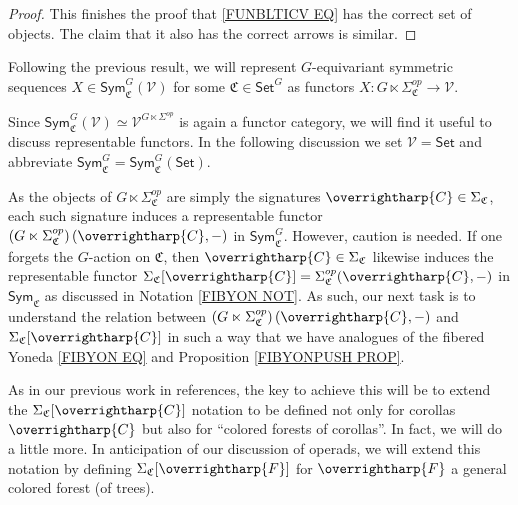 \documentclass[a4paper,10pt
,draft
]{article}%
\numberwithin{equation}{section}
\numberwithin{figure}{section}
\theoremstyle{definition} %
\newcommand{\vect}[1]{\text{\overrightharp{\ensuremath{#1}}}}
\newcommand{\V}{\ensuremath{\mathcal V}}
\newcommand{\1}{\ensuremath{\mathbbm 1}}%
\begin{document}
\begin{proof}
This finishes the proof that \eqref{FUNBLTICV EQ} has the correct set of objects. The claim that it also has the correct arrows is similar.
\end{proof}



Following the previous result, 
we will represent $G$-equivariant symmetric sequences
$X \in \mathsf{Sym}^G_{\mathfrak{C}}(\mathcal{V})$
for some $\mathfrak{C} \in \mathsf{Set}^G$
as functors
$X \colon G \ltimes \Sigma_{\mathfrak{C}}^{op} \to \mathcal{V}$.

Since  
$\mathsf{Sym}^G_{\mathfrak{C}}(\mathcal{V}) \simeq 
\V^{G \ltimes \Sigma^{op}}$ is again a functor category, 
we will find it useful to discuss representable functors.
In the following discussion 
we set $\V = \mathsf{Set}$ and abbreviate
$\mathsf{Sym}^G_{\mathfrak{C}} = \mathsf{Sym}^G_{\mathfrak{C}}(\mathsf{Set})$.

As the objects of 
$G \ltimes \Sigma^{op}_{\mathfrak{C}}$
are simply the signatures
$\vect{C} \in \Sigma_{\mathfrak{C}}$,
each such signature induces a representable functor
$\left(G \ltimes \Sigma^{op}_{\mathfrak{C}}\right)(\vect{C},-)$
in 
$\mathsf{Sym}^G_{\mathfrak{C}}$.
However, caution is needed.
If one forgets the $G$-action on $\mathfrak{C}$,
then $\vect{C} \in \Sigma_{\mathfrak{C}}$
likewise induces the representable functor 
$\Sigma_{\mathfrak{C}}[\vect{C}]=\Sigma^{op}_{\mathfrak{C}}(\vect{C},-)$
in 
$\mathsf{Sym}_{\mathfrak{C}}$
as discussed in Notation \ref{FIBYON NOT}.
%
As such, our next task is to understand the relation between 
$\left(G \ltimes \Sigma^{op}_{\mathfrak{C}}\right)(\vect{C},-)$
and 
$\Sigma_{\mathfrak{C}}[\vect{C}]$
in such a way that we have analogues of the 
fibered Yoneda \eqref{FIBYON EQ}
and Proposition \ref{FIBYONPUSH PROP}.


As in our previous work in {\color{red} references},
the key to achieve this will be to extend the
$\Sigma_{\mathfrak{C}}[\vect{C}]$
notation to be defined not only for corollas $\vect{C}$
but also for ``colored forests of corollas''.
In fact, we will do a little more. 
In anticipation of our discussion of operads, 
we will extend this notation by defining 
$\Sigma_{\mathfrak{C}}[\vect{F}]$
for $\vect{F}$ a general colored forest (of trees).
\end{document}
